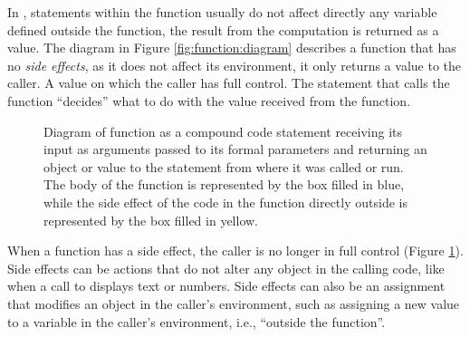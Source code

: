 \documentclass[krantz2]{krantz}\usepackage{knitr}
\begin{document}
In \Rlang, statements within the function usually do not affect directly any variable defined outside the function, the result from the computation is returned as a value. The diagram in Figure \ref{fig:function:diagram} describes a function that has no \emph{side effects}, as it does not affect its environment, it only returns a value to the caller. A value on which the caller has full control. The statement that calls the function ``decides'' what to do with the value received from the function.

\begin{figure}
  \centering
\begin{small}
\end{small}
  \caption[Diagram of function with side effects]{Diagram of function as a compound code statement receiving its input as arguments passed to its formal parameters and returning an object or value to the statement from where it was called or run. The body of the function is represented by the box filled in blue, while the side effect of the code in the function directly outside is represented by the box filled in yellow.}\label{fig:function:side:effect:diagram}
\end{figure}

When a function has a side effect, the caller is no longer in full control (Figure \ref{fig:function:side:effect:diagram}). Side effects can be actions that do not alter any object in the calling code, like when a call to  displays text or numbers. Side effects can also be an assignment that modifies an object in the caller's environment, such as assigning a new value to a variable in the caller's environment, i.e., ``outside the function''.
\end{document}
